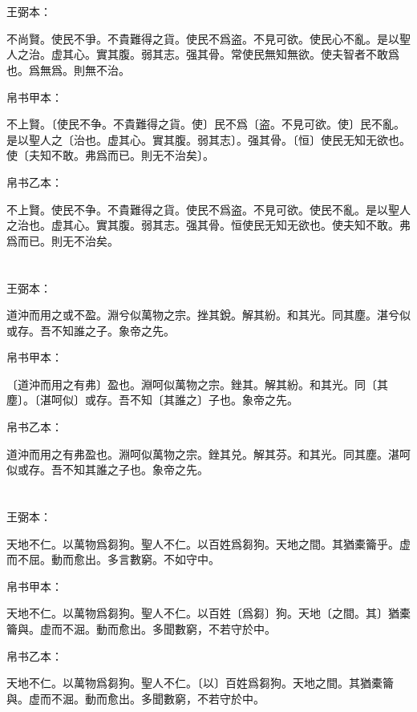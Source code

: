 \documentclass[a5paper]{ctexbook}
\begin{document}
    \chapter{}
    王弼本：

    不尚賢。使民不爭。不貴難得之貨。使民不爲盗。不見可欲。使民心不亂。是以聖人之治。虚其心。實其腹。弱其志。强其骨。常使民無知無欲。使夫智者不敢爲也。爲無爲。則無不治。

    
    帛书甲本：

    不上賢。〔使民不争。不貴難得之貨。使〕民不爲〔盗。不見可欲。使〕民不亂。是以聖人之〔治也。虚其心。實其腹。弱其志〕。强其骨。〔恒〕使民无知无欲也。使〔夫知不敢。弗爲而已。則无不治矣〕。

    帛书乙本：

    不上賢。使民不争。不貴難得之貨。使民不爲盗。不見可欲。使民不亂。是以聖人之治也。虚其心。實其腹。弱其志。强其骨。恒使民无知无欲也。使夫知不敢。弗爲而已。則无不治矣。

    \chapter{}
    王弼本：

    道沖而用之或不盈。淵兮似萬物之宗。挫其銳。解其紛。和其光。同其塵。湛兮似或存。吾不知誰之子。象帝之先。

    
    帛书甲本：

    〔道沖而用之有弗〕盈也。淵呵似萬物之宗。銼其。解其紛。和其光。同〔其塵〕。〔湛呵似〕或存。吾不知〔其誰之〕子也。象帝之先。

    帛书乙本：

    道沖而用之有弗盈也。淵呵似萬物之宗。銼其兑。解其芬。和其光。同其塵。湛呵似或存。吾不知其誰之子也。象帝之先。

    \chapter{}
    王弼本：

    天地不仁。以萬物爲芻狗。聖人不仁。以百姓爲芻狗。天地之間。其猶橐籥乎。虚而不屈。動而愈出。多言數窮。不如守中。

    
    帛书甲本：

    天地不仁。以萬物爲芻狗。聖人不仁。以百姓〔爲芻〕狗。天地〔之間。其〕猶橐籥與。虚而不淈。動而愈出。多聞數窮，不若守於中。

    帛书乙本：

    天地不仁。以萬物爲芻狗。聖人不仁。〔以〕百姓爲芻狗。天地之間。其猶橐籥與。虚而不淈。動而愈出。多聞數窮，不若守於中。
\end{document}
